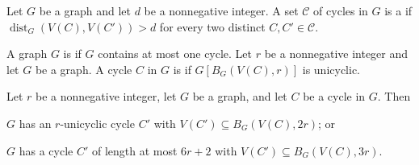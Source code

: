 \documentclass{patmorin}
\newcommand{\pat}[1]{\textcolor{Blue}{[Pat: #1]}}
\newcommand{\gwen}[1]{\textcolor{Purple}{Gwen: #1}}
\newcommand{\piotr}[1]{\textcolor{red}{Piotr: #1}}
\DeclareMathOperator{\dist}{dist}
\begin{document}
Let $G$ be a graph and let $d$ be a nonnegative integer.
A set $\mathcal{C}$ of cycles in $G$ is a  if $\dist_G(V(C),V(C'))> d$ for every two distinct $C,C'\in\mathcal{C}$.


A graph $G$ is  if $G$ contains at most one cycle.  Let $r$ be a nonnegative integer and let $G$ be a graph.
A cycle $C$ in $G$ is 
if $G[B_G(V(C),r)]$ is unicyclic.


\begin{lem}\label{short_or_unicycle_nearby}
  Let $r$ be a nonnegative integer, let $G$ be a graph, and let $C$ be a cycle in $G$.
  Then 
  \begin{tightenum}%
    \item $G$ has an $r$-unicyclic cycle $C'$ with $V(C')\subseteq B_G(V(C),2r)$; or\label{short_or_unicycle_nearby:unicyclic}     
    \item $G$ has a cycle $C'$ of length at most $6r+2$ with $V(C')\subseteq B_G(V(C),3r)$.\label{short_or_unicycle_nearby:short}     
  \end{tightenum}
\end{lem}
\end{document}
